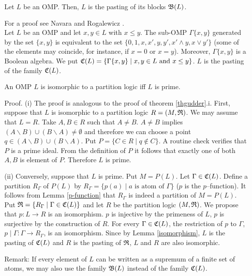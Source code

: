 \begin{theorem}
Let $L$ be an OMP.
Then, $L$ is the pasting of its blocks ${\frak B}(L)$.
\end{theorem}

For a proof see Navara and Rogalewicz \cite{navara}.\\

Let $L$ be an OMP and let $x,y \in L$ with $x \le y$.
The sub-OMP $\Gamma\{x,y\}$ generated by the set $\{x,y\}$
is equivalent to the set
$\{0,1,x,x',y,y',x' \wedge y,x \vee y'\}$
(some of the elements may coincide, for instance, if $x=0$ or $x=y$).
Moreover,
$\Gamma\{x,y\}$ is a Boolean algebra.
We put  ${\frak C}(L) = \{\Gamma\{x,y\}\mid x,y \in L \mbox{ and } x \le
y\}$. $L$ is the pasting of the family ${\frak C}(L)$.

\begin{theorem}
\label{thprime}
An OMP $L$ is isomorphic to a partition logic iff $L$ is prime.
\end{theorem}

Proof.
(i) The proof is analogous to the proof of theorem \ref{thgudder}.i.
First, suppose that $L$ is isomorphic to a partition logic
$R=(M,{\frak R})$. We may assume that $L = R$.
Take $A,B \in R$ such that $A \neq B$.
$A \neq B$ implies
$(A \backslash B) \cup (B \backslash A) \neq \emptyset$
and therefore we can choose a point
$q \in (A \backslash B) \cup (B \backslash A)$.
Put $P= \{C \in R\mid q \not\in C\}$.
A routine check verifies that $P$ is a prime ideal.
From the definition of $P$ it follows that exactly one of both $A,B$ is
element of $P$.
Therefore $L$ is prime.

(ii) Conversely, suppose that $L$ is prime.
Put $M = P(L)$.
Let $\Gamma \in {\frak C}(L)$.
Define a partition $R_{\Gamma}$ of $P(L)$ by
$R_{\Gamma} = \{p(a)\mid a \mbox{ is atom of } \Gamma \}$
($p$ is the $p$--function).
It follows from Lemma \ref{p-function} that $R_{\Gamma}$ is indeed
a partition of $M = P(L)$.
Put ${\frak R} = \{R_{\Gamma}\mid \Gamma \in {\frak C}(L)\}$ and let
$R$ be the partition logic $(M,{\frak R})$.
We propose that $p: L \rightarrow R$ is an isomorphism.
$p$ is injective by the primeness of $L$, $p$ is
surjective by the construction of $R$.
For every $\Gamma \in {\frak C}(L)$, the restriction of $p$ to
$\Gamma$, $p\mid\Gamma: \Gamma \rightarrow R_{\Gamma}$, is an isomorphism.
Since  by Lemma \ref{isomorphism}, $L$ is the pasting of ${\frak C}(L)$
and $R$ is the
pasting of ${\frak R}$, $L$ and $R$ are also isomorphic.

Remark: If every element of $L$ can be written as a supremum of
a finite set of atoms, we may also use the family ${\frak B}(L)$
instead of the family ${\frak C}(L)$.

